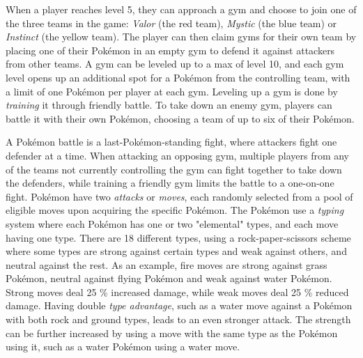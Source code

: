 When a player reaches level 5, they can approach a gym and choose to join one of the three teams in the game: \emph{Valor} (the red team), \emph{Mystic} (the blue team) or \emph{Instinct} (the yellow team). The player can then claim gyms for their own team by placing one of their Pokémon in an empty gym to defend it against attackers from other teams. A gym can be leveled up to a max of level 10, and each gym level opens up an additional spot for a Pokémon from the controlling team, with a limit of one Pokémon per player at each gym. Leveling up a gym is done by \emph{training} it through friendly battle. To take down an enemy gym, players can battle it with their own Pokémon, choosing a team of up to six of their Pokémon.

A Pokémon battle is a last-Pokémon-standing fight, where attackers fight one defender at a time. When attacking an opposing gym, multiple players from any of the teams not currently controlling the gym can fight together to take down the defenders, while training a friendly gym limits the battle to a one-on-one fight. Pokémon have two \emph{attacks} or \emph{moves}, each randomly selected from a pool of eligible moves upon acquiring the specific Pokémon. The Pokémon use a \emph{typing} system where each Pokémon has one or two "elemental" types, and each move having one type. There are 18 different types, using a rock-paper-scissors scheme where some types are strong against certain types and weak against others, and neutral against the rest. As an example, fire moves are strong against grass Pokémon, neutral against flying Pokémon and weak against water Pokémon. Strong moves deal 25 \% increased damage, while weak moves deal 25 \% reduced damage. Having double \emph{type advantage}, such as a water move against a Pokémon with both rock and ground types, leads to an even stronger attack. The strength can be further increased by using a move with the same type as the Pokémon using it, such as a water Pokémon using a water move.

